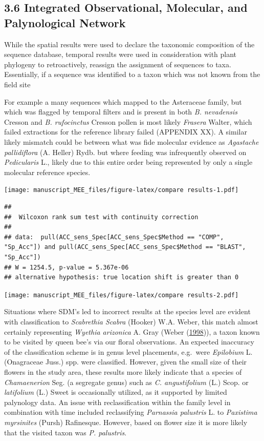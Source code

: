\documentclass[
]{article}
\begin{document}
\hypertarget{integrated-observational-molecular-and-palynological-network}{%
\subsection{3.6 \textbar{} Integrated Observational, Molecular, and
Palynological
Network}\label{integrated-observational-molecular-and-palynological-network}}

While the spatial results were used to declare the taxonomic composition
of the sequence database, temporal results were used in consideration
with plant phylogeny to retroactively, reassign the assignment of
sequences to taxa. Essentially, if a sequence was identified to a taxon
which was not known from the field site

For example a many sequences which mapped to the Asteraceae family, but
which was flagged by temporal filters and is present in both \emph{B.
nevadensis} Cresson and \emph{B. rufocinctus} Cresson pollen is most
likely \emph{Frasera} Walter, which failed extractions for the reference
library failed (APPENDIX XX). A similar likely mismatch could be between
what was fide molecular evidence as \emph{Agastache pallidiflora} (A.
Heller) Rydb. but where feeding was infrequently observed on
\emph{Pedicularis} L., likely due to this entire order being represented
by only a single molecular reference species.

\texttt{[image: manuscript\_MEE\_files/figure-latex/compare results-1.pdf]}

\begin{verbatim}
## 
##  Wilcoxon rank sum test with continuity correction
## 
## data:  pull(ACC_sens_Spec[ACC_sens_Spec$Method == "COMP", "Sp_Acc"]) and pull(ACC_sens_Spec[ACC_sens_Spec$Method == "BLAST", "Sp_Acc"])
## W = 1254.5, p-value = 5.367e-06
## alternative hypothesis: true location shift is greater than 0
\end{verbatim}

\texttt{[image: manuscript\_MEE\_files/figure-latex/compare results-2.pdf]}

Situations where SDM's led to incorrect results at the species level are
evident with classification to \emph{Scabrethia Scabra} (Hooker) W.A.
Weber, this match almost certainly representing \emph{Wyethia arizonica}
A. Gray (Weber (\protect\hyperlink{ref-weber1998new}{1998})), a taxon
known to be visited by queen bee's via our floral observations. An
expected inaccuracy of the classification scheme is in genus level
placements, e.g.~were \emph{Epilobium} L. (Onagraceae Juss.) spp. were
classified. However, given the small size of their flowers in the study
area, these results more likely indicate that a species of
\emph{Chamaenerion} Seg. (a segregate genus) such as \emph{C.
angustifolium} (L.) Scop. or \emph{latifolium} (L.) Sweet is
occasionally utilized, as it supported by limited palynology data. An
issue with reclassification within the family level in combination with
time included reclassifying \emph{Parnassia palustris} L. to
\emph{Paxistima myrsinites} (Pursh) Rafinesque. However, based on flower
size it is more likely that the visited taxon was \emph{P. palustris}.
\end{document}
